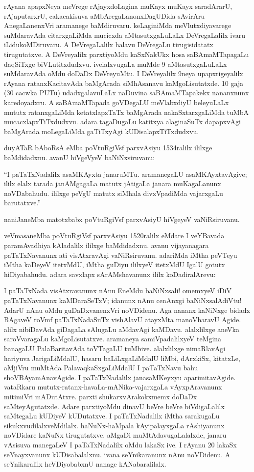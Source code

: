 \documentclass[11pt,a4size]{article}
\begin{document}
rAyana apapxNeya meVrege rAjayxdoLagina muKayx muKayx saradArarU,
rAjaputarxrU, cakacakisuva aMbAregaLanonxDagUDida sAvirAru
AnegaLanenxVri aramanege baMdiruvaru. keLaginiMda meVlutxdiyavarege
suMdaravAda citarxgaLiMda mucicxda aMtasutxgaLuLaLx DeVregaLalilx
ivaru iLidukoMDiruvaru. A DeVregaLalilx halavu DeVregaLu
tirugisidatatx tirugutatxve. A DeVreyalilx parxtiyoMdu kaSxNakUkx hosa
saBAmaMTapagaLu daqSiTxge biVLutitxdudxvu. ivelalxvugaLa muMde 9
aMtasutxgaLuLaLx suMdaravAda oMdu doDaDx DeVreyuMtu. I DeVreyalilx
9neya upapxrigeyalilx rAyana ratanxKacitavAda baMgArada siMhAsanavu
kaMgoLisutatxde. 10 gaja (30 cacwka PUTu) udadxgalavuLaLx naDuvina
saBAmaMTapakekx nananxnunx karedoyadxru. A saBAmaMTapada goVDegaLU
meVlabxdiyU beleyuLaLx mututx ratanxgaLiMda ketatxlapxTaTx baMgArada
nakaSxtarxgaLiMda tuMbA mucacxlapxTiTxdudxvu. adara tagaDugaLu
katitxya alaginaSuTx dapapxvAgi baMgArada moLegaLiMda gaTiTxyAgi
kUDisalapxTiTxdudxvu.

duyATaR bAboRsA eMba poVtuRgiVsf parxvAsiyu 1534ralilx ililxge
baMdidadxnu. avanU hiVgeVyeV baNiNxsiruvanu:

``I paTaTxNadalilx asaMKAyxta janaruMTu. aramanegaLU asaMKAyxtavAgive;
ililx elalx tarada janAMgagaLa matutx jAtigaLa janara muKagaLanunx
noVDabahudu. ililxge peVgU matutx siMhala divxVpadiMda vajarxgaLu
barutatxve.''

naniJaneMba matotxbabx poVtuRgiVsf parxvAsiyU hiVgeyeV vaNiRsiruvanu.

veVmasaneMba poVtuRgiVsf parxvAsiyu 1520ralilx eMdare I veYBavada
paramAvadhiya kAladalilx ililxge baMdidadxnu. avanu vijayanagara
paTaTxNavanunx ati visAtxravAgi vaNiRsiruvanu. adariMda iMtha peVTeyu
iMtha kaDeyeV itetxMdU, iMtha guDiyu ililxyeV itetxMdU IgalU gotutx
hiDiyabahudu. adara savxlapx sArAMshavanunx ililx koDadiralArevu:

I paTaTxNada visAtxravanunx nAnu EneMdu baNiNxsali! omemxyeV iDiV
paTaTxNavanunx kaMDaraSeTxV; idanunx nAnu cenAnxgi baNiNxsalAdiVtu!
AdarU nAnu oMdu guDaDxvanenxVri noVDidenu. Aga nananx kaNiNxge bidadx
BAgaveV roVmf paTaTxNadaSuTx vishAlavU atayxMta manoVharavU
Agide. alilx nibiDavAda giDagaLa sAlugaLu aMdavAgi
kaMDavu. alalxlilxge aneVka saroVvaragaLu kaMgoLisutatxve. aramaneya
samiVpadalilxyeV teMgina banagaLU PalaBaritavAda toVTagaLU
tuMbive. alalxlilxge nimaRlavAgi hariyuva JarigaLiMdalU, hasaru
baLiLxgaLiMdalU liMbi, dArxkiSx, kitatxLe, aMjiVru muMtAda
PalavaqkaSxgaLiMdalU I paTaTxNavu bahu shoVBAyamAnavAgide. I
paTaTxNadalilx janasaMKeyxyu aparimitavAgide. vataRkaru
mututx-ratanx-havaLa-mANika-vajarxgaLa vAyxpAravanunx mitimiVri
mADutAtxre. parxti shukarxvArakokxmemx doDaDx saMteyAgutatxde. Adare
parxtiyoMdu dinavU beVre beVre biVdigaLalilx saMtegaLu kUDiyeV
kUDutatxve. I paTaTxNadalilx iMtha sarakugaLu
sikukxvudilalxveMdilalx. haNuNx-haMpala kAyipalayxgaLa rAshiyanunx
noVDidare kaNuNx tirugutatxve. aMgaDi muMtAdavugaLalalxde, janaru
vAsisuva manegaLeV I paTaTxNadalilx oMdu lakaSx ive. I rAyanu 20
lakaSx seYnayxvanunx kUDisabalalxnu. ivana seYnikaranunx nAnu
noVDidenu. A seYnikaralilx heVDiyobabxnU nanage kANabaralilalx.
\end{document}
